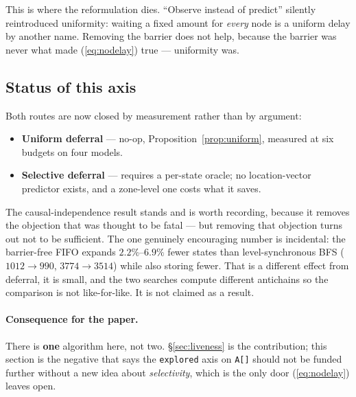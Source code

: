 This is where the reformulation dies. ``Observe instead of predict'' silently reintroduced
uniformity: waiting a fixed amount for \emph{every} node is a uniform delay by another name.
Removing the barrier does not help, because the barrier was never what made
(\ref{eq:nodelay}) true --- uniformity was.

\subsection{Status of this axis}

Both routes are now closed by measurement rather than by argument:

\begin{itemize}
  \item \textbf{Uniform deferral} --- no-op, Proposition~\ref{prop:uniform}, measured at six
        budgets on four models.
  \item \textbf{Selective deferral} --- requires a per-state oracle; no location-vector predictor
        exists, and a zone-level one costs what it saves.
\end{itemize}

The causal-independence result stands and is worth recording, because it removes the objection that
was thought to be fatal --- but removing that objection turns out not to be sufficient. The one
genuinely encouraging number is incidental: the barrier-free FIFO expands $2.2\%$--$6.9\%$ fewer
states than level-synchronous BFS ($1012 \to 990$, $3774 \to 3514$) while also storing fewer. That
is a different effect from deferral, it is small, and the two searches compute different antichains
so the comparison is not like-for-like. It is not claimed as a result.

\paragraph{Consequence for the paper.} There is \textbf{one} algorithm here, not two.
\S\ref{sec:liveness} is the contribution; this section is the negative that says the
\texttt{explored} axis on \texttt{A[]} should not be funded further without a new idea about
\emph{selectivity}, which is the only door (\ref{eq:nodelay}) leaves open.

